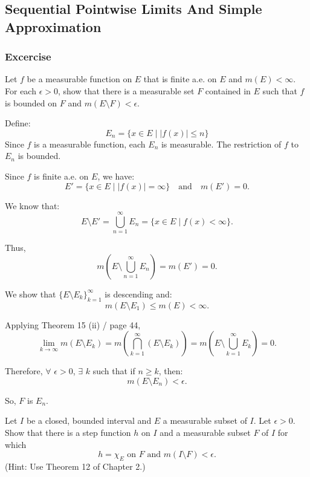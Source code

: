 \subsection{Sequential Pointwise Limits And Simple Approximation}

\subsubsection{Excercise}

\begin{exercise}{14}
    Let $f$ be a measurable function on $E$ that is finite a.e. on $E$ and $m(E) < \infty$. For each $\epsilon > 0$, show that there is a measurable set $F$ contained in $E$ such that $f$ is bounded on $F$ and $m(E \setminus F) < \epsilon$.
\end{exercise}

\begin{solution}
    Define:
\[
E_n = \{ x \in E \mid |f(x)| \leq n \}
\]
Since $f$ is a measurable function, each $E_n$ is measurable.  
The restriction of $f$ to $E_n$ is bounded.

Since $f$ is finite a.e. on $E$, we have:
\[
E' = \{ x \in E \mid |f(x)| = \infty \} \quad \text{and} \quad m(E') = 0.
\]

We know that:
\[
E \setminus E' = \bigcup_{n=1}^{\infty} E_n = \{ x \in E \mid f(x) < \infty \}.
\]

Thus, 
\[
m(E \setminus \bigcup_{n=1}^{\infty} E_n) = m(E') = 0.
\]

We show that $\{ E \setminus E_k \}_{k=1}^{\infty}$ is descending and:
\[
m(E \setminus E_1) \leq m(E) < \infty.
\]

Applying Theorem 15 (ii) / page 44,
\[
\lim_{k \to \infty} m(E \setminus E_k) = m \left(  \bigcap_{k=1}^{\infty} ( E \setminus E_k ) \right) = m \left(  E \setminus \bigcup_{k=1}^{\infty} E_k \right)  = 0.
\]

Therefore, $\forall$ $\epsilon > 0$, $\exists$ $k$ such that if $n \geq k$, then:
\[
m(E \setminus E_{n}) < \epsilon.
\]

So, $F$ is $E_n$.
\end{solution}

\begin{exercise}{16} \label{ex:16}
    Let $I$ be a closed, bounded interval and $E$ a measurable subset of $I$. Let $\epsilon > 0$. Show that there is a step function $h$ on $I$ and a measurable subset $F$ of $I$ for which
    \begin{equation*}
        h = \chi_E \text{ on } F \text{ and } m(I \setminus F) < \epsilon.
    \end{equation*}
    (Hint: Use Theorem 12 of Chapter 2.)
\end{exercise}

